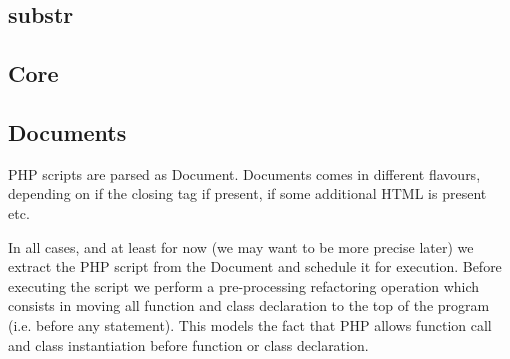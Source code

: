 \documentclass{article}
\begin{document}
\begin{kdefinition}
\begin{module}{}
\begin{kblock}[text]
 \subsection{substr} \end{kblock}

\begin{syntaxBlock}{}
\end{syntaxBlock}
\end{module}
\begin{module}{}
\begin{kblock}[text]
 \section{Core} \end{kblock}
\begin{kblock}[text]
 \subsection{Documents} 
		PHP scripts are parsed as Document. Documents comes in different flavours, depending
		on if the closing tag if present, if some additional HTML is present etc. \end{kblock}
\begin{kblock}[text]
 In all cases, and at least for now (we may want to be more precise later) we extract the PHP
	script from the Document and schedule it for execution. 
	Before executing the script we perform a pre-processing refactoring operation which consists 
	in moving all function and class declaration to the top of the program (i.e. before any 
	statement). This models the fact that PHP allows function call and class instantiation before 
	function or class declaration. \end{kblock}


\end{module}
\end{kdefinition}
\end{document}
